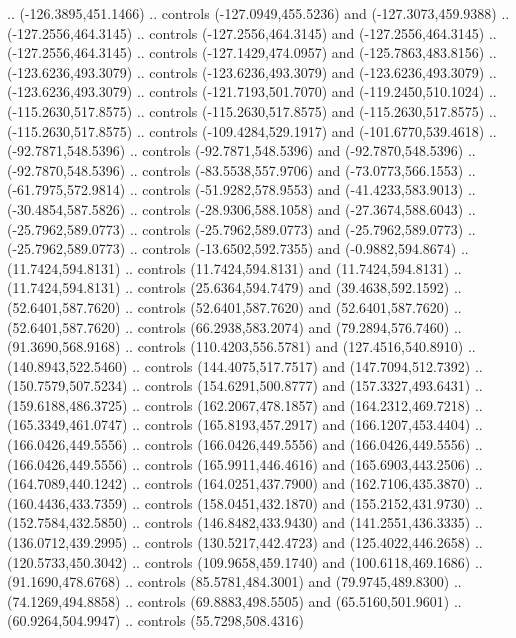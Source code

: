 \begin{scope}[shift={(407.03862,-246.29561)}]
    .. (-126.3895,451.1466) .. controls (-127.0949,455.5236) and
    (-127.3073,459.9388) .. (-127.2556,464.3145) .. controls (-127.2556,464.3145)
    and (-127.2556,464.3145) .. (-127.2556,464.3145) .. controls
    (-127.1429,474.0957) and (-125.7863,483.8156) .. (-123.6236,493.3079) ..
    controls (-123.6236,493.3079) and (-123.6236,493.3079) .. (-123.6236,493.3079)
    .. controls (-121.7193,501.7070) and (-119.2450,510.1024) ..
    (-115.2630,517.8575) .. controls (-115.2630,517.8575) and (-115.2630,517.8575)
    .. (-115.2630,517.8575) .. controls (-109.4284,529.1917) and
    (-101.6770,539.4618) .. (-92.7871,548.5396) .. controls (-92.7871,548.5396)
    and (-92.7870,548.5396) .. (-92.7870,548.5396) .. controls (-83.5538,557.9706)
    and (-73.0773,566.1553) .. (-61.7975,572.9814) .. controls (-51.9282,578.9553)
    and (-41.4233,583.9013) .. (-30.4854,587.5826) .. controls (-28.9306,588.1058)
    and (-27.3674,588.6043) .. (-25.7962,589.0773) .. controls (-25.7962,589.0773)
    and (-25.7962,589.0773) .. (-25.7962,589.0773) .. controls (-13.6502,592.7355)
    and (-0.9882,594.8674) .. (11.7424,594.8131) .. controls (11.7424,594.8131)
    and (11.7424,594.8131) .. (11.7424,594.8131) .. controls (25.6364,594.7479)
    and (39.4638,592.1592) .. (52.6401,587.7620) .. controls (52.6401,587.7620)
    and (52.6401,587.7620) .. (52.6401,587.7620) .. controls (66.2938,583.2074)
    and (79.2894,576.7460) .. (91.3690,568.9168) .. controls (110.4203,556.5781)
    and (127.4516,540.8910) .. (140.8943,522.5460) .. controls (144.4075,517.7517)
    and (147.7094,512.7392) .. (150.7579,507.5234) .. controls (154.6291,500.8777)
    and (157.3327,493.6431) .. (159.6188,486.3725) .. controls (162.2067,478.1857)
    and (164.2312,469.7218) .. (165.3349,461.0747) .. controls (165.8193,457.2917)
    and (166.1207,453.4404) .. (166.0426,449.5556) .. controls (166.0426,449.5556)
    and (166.0426,449.5556) .. (166.0426,449.5556) .. controls (165.9911,446.4616)
    and (165.6903,443.2506) .. (164.7089,440.1242) .. controls (164.0251,437.7900)
    and (162.7106,435.3870) .. (160.4436,433.7359) .. controls (158.0451,432.1870)
    and (155.2152,431.9730) .. (152.7584,432.5850) .. controls (146.8482,433.9430)
    and (141.2551,436.3335) .. (136.0712,439.2995) .. controls (130.5217,442.4723)
    and (125.4022,446.2658) .. (120.5733,450.3042) .. controls (109.9658,459.1740)
    and (100.6118,469.1686) .. (91.1690,478.6768) .. controls (85.5781,484.3001)
    and (79.9745,489.8300) .. (74.1269,494.8858) .. controls (69.8883,498.5505)
    and (65.5160,501.9601) .. (60.9264,504.9947) .. controls (55.7298,508.4316)

\end{scope}
